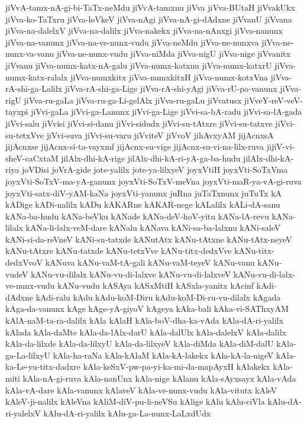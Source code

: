 {jiVvA-tamx-nA-gi-bi-TaTx-neMdu
jiVvA-tamxnu
jiVva
jiVva-BUtaH
jiVvakUkx
jiVva-ko-TaTxru
jiVva-loVkeV
jiVva-nAgi
jiVva-nA-gi-dAdxne
jiVvanU
jiVvana
jiVva-na-dalelxV
jiVva-na-dalilx
jiVva-nakekx
jiVva-na-nAnxgi
jiVva-nanunx
jiVva-na-vanunx
jiVva-na-ve-nunx-vudu
jiVva-neMdu
jiVva-ne-nunxva
jiVva-ne-nunx-va-vanu
jiVva-ne-nunx-vudu
jiVva-niMda
jiVva-nigU
jiVva-nige
jiVvanitx
jiVvanu
jiVva-numx-katx-nA-galu
jiVva-numx-katxnu
jiVva-numx-katxrU
jiVva-numx-katx-ralalx
jiVva-numxkitx
jiVva-numxkitxH
jiVva-numx-kotxVna
jiVva-rA-shi-ga-Lalilx
jiVva-rA-shi-ga-Lige
jiVva-rA-shi-yAgi
jiVva-rU-pa-vanunx
jiVva-rigU
jiVva-ru-gaLa
jiVva-ru-ga-Li-gelAlx
jiVva-ru-gaLu
jiVvatusx
jiVveY-reV-veV-tayxpi
jiVvi-gaLa
jiVvi-ga-Lanunx
jiVvi-ga-Lige
jiVvi-sa-bA-radu
jiVvi-sa-lA-gada
jiVvi-salu
jiVvisi
jiVvi-si-danu
jiVvi-sidudx
jiVvi-su-tAtxre
jiVvi-su-tatxve
jiVvi-su-tetxVve
jiVvi-suva
jiVvi-su-varu
jiVviteV
jiVvoV
jihAvxyAM
jijAcnxsA
jijAcnxse
jijAcnx-si-ta-vayxmf
jijAcnx-su-vige
jijAcnx-su-vi-na-lilx-ruva
jijiV-vi-sheV-caCxtaM
jilAlx-dhi-kA-rige
jilAlx-dhi-kA-ri-yA-ga-ba-hudu
jilAlx-dhi-kA-riya
joVDisi
joVrA-gide
jote-yalilx
jote-ya-lilxyeV
joyxVtiH
joyxVti-SoTxVma
joyxVti-SoTxV-ma-yA-ganunx
joyxVti-SoTxV-meVna
joyxVti-maR-ya-vA-gi-ruva
joyxVti-satx-diV-yAM-kaNa
joyxVti-yanunx
juRna
juTaTxnunx
juTuTx
kA
kADige
kADi-nalilx
kADu
kAKARne
kAKAR-nege
kALalilx
kALi-dA-sanu
kANa-ba-hudu
kANa-beVku
kANade
kANa-deV-hoV-yitu
kANa-lA-revu
kANa-lilalx
kANa-li-lalx-veM-dare
kANalu
kANava
kANi-sa-ba-lalxnu
kANi-saleV
kANi-si-da-reVneV
kANi-su-tatxde
kANutAtx
kANu-tAtxne
kANu-tAtx-neyeV
kANu-tAtxre
kANu-tatxde
kANu-tetxVve
kANu-titx-dedxVve
kANu-titx-dedxVvoV
kANuva
kANu-vaM-tA-gali
kANu-vaM-teyeV
kANu-vanu
kANu-vudeV
kANu-vu-dilalx
kANu-vu-di-lalxve
kANu-vu-di-lalxveV
kANu-vu-di-lalx-ve-nunx-vudu
kANu-vudu
kASAya
kASxMtiH
kASxla-yanitx
kAcinf
kAdi-dAdxne
kAdi-ralu
kAdu
kAdu-koM-Diru
kAdu-koM-Di-ru-vu-dilalx
kAgada
kAga-da-vanunx
kAge
kAge-yA-giyoV
kAgeya
kAka-bali
kAka-vi-SAThxyAM
kAlA-naM-ta-ra-dalilx
kAla
kAlaH
kAla-boV-dha-ka-vAda
kAla-dA-ri-yalilx
kAlada
kAla-daMte
kAla-da-lAlx-darU
kAla-dalUlx
kAla-dalelxV
kAla-dalilx
kAla-da-lilxde
kAla-da-lilxyU
kAla-da-lilxyeV
kAla-diMda
kAla-diM-dalU
kAla-ga-La-lilxyU
kAla-ha-raNa
kAla-kAlaM
kAla-kA-lakekx
kAla-kA-la-nigeV
kAla-ka-Le-yu-titx-dadxre
kAla-keSxV-pw-pa-yi-ka-mi-da-mapAyxH
kAlakekx
kAla-miti
kAla-nA-gi-ruva
kAla-nanUnx
kAla-nige
kAlanu
kAla-sAyxsayx
kAla-vAda
kAla-vA-dare
kAla-vanunx
kAlaveV
kAla-ve-nunx-vudu
kAla-vitutx
kAleV
kAleV-ji-nalilx
kAleVna
kAliM-diV-pu-li-neVSu
kAlige
kAlu
kAlu-ciVla
kAlu-dA-ri-yalelxV
kAlu-dA-ri-yalilx
kAlu-ga-La-nunx-LaLxdUdx
}
